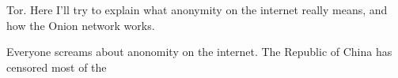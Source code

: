 Tor. Here I'll try to explain what anonymity on the internet really means, and how the Onion network works.

Everyone screams about anonomity on the internet. The Republic of China has censored most of the 
